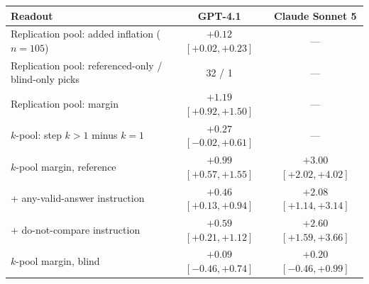 \begin{tabular}{lcc}
\toprule
Readout & GPT-4.1 & Claude Sonnet 5 \\
\midrule
Replication pool: added inflation ($n{=}105$) & $+0.12$ {\scriptsize$[+0.02,+0.23]$} & --- \\
Replication pool: referenced-only / blind-only picks & 32 / 1 & --- \\
Replication pool: margin & $+1.19$ {\scriptsize$[+0.92,+1.50]$} & --- \\
$k$-pool: step $k{>}1$ minus $k{=}1$ & $+0.27$ {\scriptsize$[-0.02,+0.61]$} & --- \\
$k$-pool margin, reference & $+0.99$ {\scriptsize$[+0.57,+1.55]$} & $+3.00$ {\scriptsize$[+2.02,+4.02]$} \\
\quad + any-valid-answer instruction & $+0.46$ {\scriptsize$[+0.13,+0.94]$} & $+2.08$ {\scriptsize$[+1.14,+3.14]$} \\
\quad + do-not-compare instruction & $+0.59$ {\scriptsize$[+0.21,+1.12]$} & $+2.60$ {\scriptsize$[+1.59,+3.66]$} \\
$k$-pool margin, blind & $+0.09$ {\scriptsize$[-0.46,+0.74]$} & $+0.20$ {\scriptsize$[-0.46,+0.99]$} \\
\bottomrule
\end{tabular}
